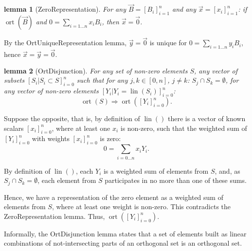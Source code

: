 \documentclass{mathcryptology} %
\DeclareMathOperator{\lin}{lin}
\DeclareMathOperator{\ort}{ort}
\theoremstyle{title}
\newtheorem*{titlelemma}{lemma}
\theoremstyle{titleof}
\renewenvironment{proof}{\noindent{\bfseries Proof:} }{}
\begin{document}
    \begin{titlelemma}[ZeroRepresentation]
        For any $\vec{B}={\left[B_i\right]}_{i=1}^{n}$ and any $\vec{x}={\left[x_i\right]}_{i=1}^{n}$: if $\ort \left(\vec{B}\right)$ and $0=\sum_{i=1\dots{}n}x_i B_i$, then $\vec{x}=\vec{0}$.
    \end{titlelemma}
    \begin{proof}
        By the OrtUniqueRepresentation lemma, $\vec{y}=\vec{0}$ is unique for $0=\sum_{i=1\dots{}n} y_i B_i$, hence $\vec{x}=\vec{y}=\vec{0}$.
    \end{proof}

    \begin{titlelemma}[OrtDisjunction]
        For any set of non-zero elements $S$, any vector of subsets ${\left[S_{i}|S_{i} \subset S\right]}_{i=0}^{n}$ such that for any $j,k \in \left[0,n\right]$, $j\neq k$: $S_{j} \cap S_{k} = \emptyset$, for any vector of non-zero elements ${\left[Y_{i}|Y_{i}=\lin\left(S_{i}\right)\right]}_{i=0}^{n}$:
        \begin{equation*}
            \ort\left(S\right) \Rightarrow \ort\left( {\left[Y_{i}\right]}_{i=0}^{n}\right).
        \end{equation*}
    \end{titlelemma}
    \begin{proof}
        Suppose the opposite, that is, by definition of $\lin()$ there is a vector of known scalars ${\left[x_{i}\right]}_{i=0}^{n}$, where at least one $x_{i}$ is non-zero, such that the weighted sum of ${\left[Y_{i}\right]}_{i=0}^{n}$  with weights ${\left[x_{i}\right]}_{i=0}^{n}$ is zero:
        \begin{equation*}
            0=\sum_{i=0\dots{}n} x_iY_i.
        \end{equation*}

        By definition of $\lin()$, each $Y_{i}$ is a weighted sum of elements from $S$, and, as $S_{j} \cap S_{k} = \emptyset$, each element from $S$ participates in no more than one of these sums.

        Hence, we have a representation of the zero element as a weighted sum of elements from $S$, where at least one weight is non-zero. This contradicts the ZeroRepresentation lemma.
        Thus, $\ort\left({\left[Y_{i}\right]}_{i=0}^{n}\right)$.

        Informally, the OrtDisjunction lemma states that a set of elements built as linear combinations of not-intersecting parts of an orthogonal set is an orthogonal set.
    \end{proof}
\end{document}

